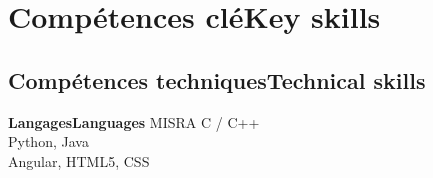 \vspace{-1.3cm}

\ifnativelang
\newcommand{\CVheader}{6+ ann\'ees d'exp\'erience en ing\'enierie des syst\`emes embarqu\'es et r\'eseaux.\\%
Expérience en conduite d’équipe et normes médicales.}
\else
\newcommand{\CVheader}{6+ years of experience in Real-Time systems, embedded linux and networking.\\
Experience in project steering and team management.}
\fi


\section{\ifnativelang Comp\'etences cl\'e\else Key skills\fi}
\subsection{\ifnativelang Comp\'etences techniques\else Technical skills\fi}

{\ifnativelang\textbf{Langages}\else \textbf{Languages}\fi}{
 MISRA C / C++\\
 Python, Java \\
 Angular, HTML5, CSS
}

